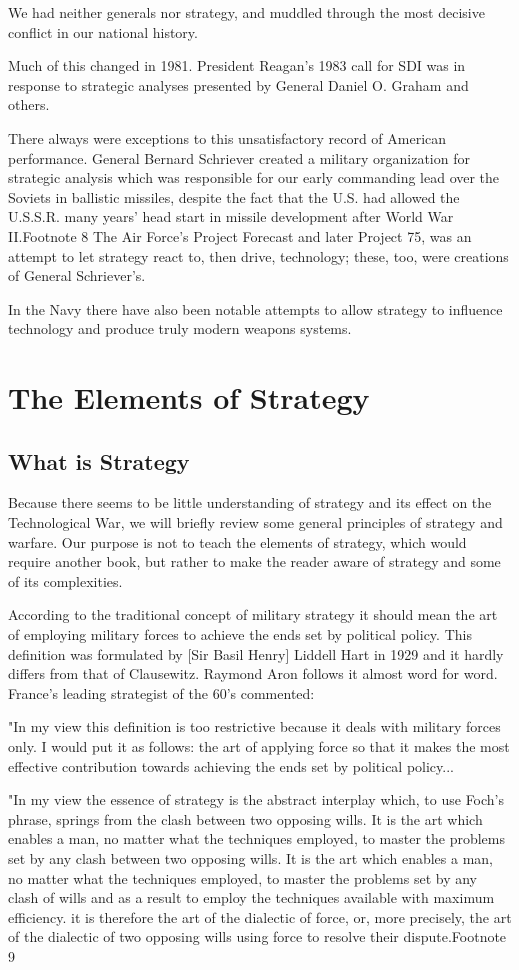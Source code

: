 We had neither generals nor strategy, and muddled through the most decisive conflict in our national history.

Much of this changed in 1981. President Reagan's 1983 call for SDI was in response to strategic analyses presented by General Daniel O. Graham and others.

There always were exceptions to this unsatisfactory record of American performance. General Bernard Schriever created a military organization for strategic analysis which was responsible for our early commanding lead over the Soviets in ballistic missiles, despite the fact that the U.S. had allowed the U.S.S.R. many years' head start in missile development after World War II.Footnote 8 The Air Force's Project Forecast and later Project 75, was an attempt to let strategy react to, then drive, technology; these, too, were creations of General Schriever's.

In the Navy there have also been notable attempts to allow strategy to influence technology and produce truly modern weapons systems.

\section{The Elements of Strategy}
\subsection{What is Strategy}
Because there seems to be little understanding of strategy and its effect on the Technological War, we will briefly review some general principles of strategy and warfare. Our purpose is not to teach the elements of strategy, which would require another book, but rather to make the reader aware of strategy and some of its complexities.

According to the traditional concept of military strategy it should mean the art of employing military forces to achieve the ends set by political policy. This definition was formulated by [Sir Basil Henry] Liddell Hart in 1929 and it hardly differs from that of Clausewitz. Raymond Aron follows it almost word for word. France's leading strategist of the 60's commented:

"In my view this definition is too restrictive because it deals with military forces only. I would put it as follows: the art of applying force so that it makes the most effective contribution towards achieving the ends set by political policy...

"In my view the essence of strategy is the abstract interplay which, to use Foch's phrase, springs from the clash between two opposing wills. It is the art which enables a man, no matter what the techniques employed, to master the problems set by any clash between two opposing wills. It is the art which enables a man, no matter what the techniques employed, to master the problems set by any clash of wills and as a result to employ the techniques available with maximum efficiency. it is therefore the art of the dialectic of force, or, more precisely, the art of the dialectic of two opposing wills using force to resolve their dispute.Footnote 9

